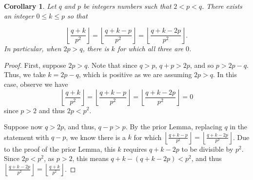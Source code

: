 \documentclass[11pt]{amsart}
\numberwithin{equation}{section}
\theoremstyle{plain}
\newtheorem{cor}[equation]{Corollary}
\theoremstyle{definition}
\begin{document}
\begin{cor}\label{cor:qpk} Let $q$ and $p$ be integers numbers such that $2<p<q$. 
There exists an integer $0\leq k\leq p$ so that

$$\left\lfloor\frac{q+k}{p^2}\right\rfloor = \left\lfloor\frac{q+k-p}{p^2}\right\rfloor= \left\lfloor\frac{q+k-2p}{p^2}\right\rfloor.$$
In particular, when $2p>q$, there is $k$ for which all three are $0$.
\end{cor}
\begin{proof}
First, suppose $2p>q$. Note that since $q>p$, $q+p>2p$, and so $p>2p-q$. Thus, we take $k=2p-q$, which is positive as we are assuming $2p>q$. In this case, observe we have 
$$\left\lfloor\frac{q+k}{p^2}\right\rfloor = \left\lfloor\frac{q+k-p}{p^2}\right\rfloor= \left\lfloor\frac{q+k-2p}{p^2}\right\rfloor=0$$
since $p>2$ and thus $2p<p^2$.

Suppose now $q>2p$, and thus, $q-p>p$. By the prior Lemma, replacing $q$ in the statement with $q-p$, we know there is a $k$ for which $\left\lfloor\frac{q+k-p}{p^2}\right\rfloor= \left\lfloor\frac{q+k-2p}{p^2}\right\rfloor$. Due to the proof of the prior Lemma, this $k$ requires $q+k-2p$ to be divisible by $p^2$. Since $2p<p^2$, as $p>2$, this means $q+k-(q+k-2p)<p^2$, and thus $\left\lfloor\frac{q+k-2p}{p^2}\right\rfloor= \left\lfloor\frac{q+k}{p^2}\right\rfloor$.
\end{proof}
\end{document}
